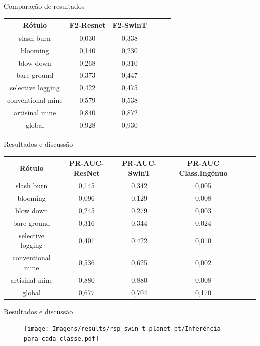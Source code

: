 \documentclass[8pt]{beamer}
\begin{document}
\begin{frame}{Comparação de resultados}
    \centering
    \begin{tabular}{*{6}{c}}
        \hline
        Rótulo &F2-Resnet&F2-SwinT \\
        \hline
                slash burn &  0,030 &  0,338 \\ 
                  blooming &  0,140 &  0,230 \\
                 blow down &  0,268 &  0,310 \\
               bare ground &  0,373 &  0,447 \\
         selective logging &  0,422 &  0,475 \\
         conventional mine &  0,579 &  0,538 \\
            artisinal mine &  0,840 &  0,872 \\
                    global &  0,928 &  0,930 \\
        \hline
    \end{tabular}    
\end{frame}    

\begin{frame}{Resultados e discussão}
    \begin{tabular}{*{6}{c}}
        \hline
        Rótulo &PR-AUC-ResNet&PR-AUC-SwinT&PR-AUC Class.Ingênuo \\
        \hline
                slash burn &       0,145 &      0,342 &     0,005 \\
                  blooming &       0,096 &      0,129 &     0,008 \\
                 blow down &       0,245 &      0,279 &     0,003 \\
               bare ground &       0,316 &      0,344 &     0,024 \\
         selective logging &       0,401 &      0,422 &     0,010 \\
         conventional mine &       0,536 &      0,625 &     0,002 \\
            artisinal mine &       0,880 &      0,880 &     0,008 \\
                    global &       0,677 &      0,704 &     0,170 \\
        \hline
    \end{tabular}    
\end{frame}    


\begin{frame}{Resultados e discussão}
    \begin{figure}[!ht]
        \centering
        \texttt{[image: Imagens/results/rsp-swin-t\_planet\_pt/Inferência para cada classe.pdf]}
        \label{fig:InferenciaClassesSwin}
    \end{figure}    
\end{frame}    
\end{document}

